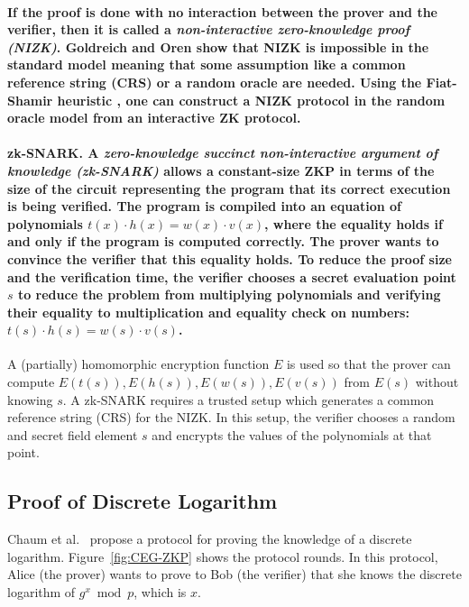 \documentclass[11pt]{article}
\theoremstyle{plain}
\begin{document}
\paragraph{\textmd{If the proof is done with no interaction between the prover
		and the verifier, then it is called a }\textmd{\emph{non-interactive
			zero-knowledge proof (NIZK)}}\textmd{. Goldreich and Oren \cite{goldreich1994}
		show that NIZK is impossible in the standard model meaning that some
		assumption like a common reference string (CRS) or a random oracle
		are needed. Using the Fiat-Shamir heuristic \cite{fiat1986prove}, one
		can construct a NIZK protocol in the random oracle model from an interactive
		ZK protocol. }}

\paragraph{zk-SNARK.\textmd{ A }\textmd{\emph{zero-knowledge succinct non-interactive
			argument of knowledge (zk-SNARK)}}\textmd{ allows a constant-size
		ZKP in terms of the size of the circuit representing the program that
		its correct execution is being verified. The program is compiled into
		an equation of polynomials $t(x)\cdot h(x)=w(x)\cdot v(x)$, where
		the equality holds if and only if the program is computed correctly.
		The prover wants to convince the verifier that this equality holds.
		To reduce the proof size and the verification time, the verifier chooses
		a secret evaluation point $s$ to reduce the problem from multiplying
		polynomials and verifying their equality to multiplication and equality
		check on numbers: $t(s)\cdot h(s)=w(s)\cdot v(s)$.}}

A (partially) homomorphic encryption function $E$ is used so that
the prover can compute $E(t(s)),E(h(s)),E(w(s)),E(v(s))$ from $E(s)$
without knowing $s$. A zk-SNARK requires a trusted setup which generates
a common reference string (CRS) for the NIZK. In this setup, the verifier
chooses a random and secret field element $s$ and encrypts the values
of the polynomials at that point.

\subsection{Proof of Discrete Logarithm}

Chaum et al.\ \cite{Chaum:87:ZKP} propose a protocol for proving
the knowledge of a discrete logarithm. Figure~\ref{fig:CEG-ZKP}
shows the protocol rounds. In this protocol, Alice (the prover) wants
to prove to Bob (the verifier) that she knows the discrete logarithm
of $g^{x}\bmod p$, which is $x$.
\end{document}
